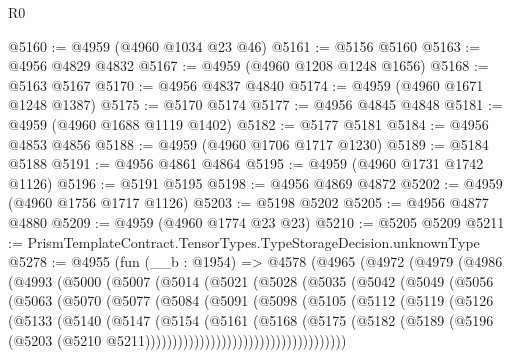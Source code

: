 \begin{lexlean}{R0}
\begin{coremodule}
@5160 := @4959 (@4960 @1034 @23 @46)
@5161 := @5156 @5160
@5163 := @4956 @4829 @4832
@5167 := @4959 (@4960 @1208 @1248 @1656)
@5168 := @5163 @5167
@5170 := @4956 @4837 @4840
@5174 := @4959 (@4960 @1671 @1248 @1387)
@5175 := @5170 @5174
@5177 := @4956 @4845 @4848
@5181 := @4959 (@4960 @1688 @1119 @1402)
@5182 := @5177 @5181
@5184 := @4956 @4853 @4856
@5188 := @4959 (@4960 @1706 @1717 @1230)
@5189 := @5184 @5188
@5191 := @4956 @4861 @4864
@5195 := @4959 (@4960 @1731 @1742 @1126)
@5196 := @5191 @5195
@5198 := @4956 @4869 @4872
@5202 := @4959 (@4960 @1756 @1717 @1126)
@5203 := @5198 @5202
@5205 := @4956 @4877 @4880
@5209 := @4959 (@4960 @1774 @23 @23)
@5210 := @5205 @5209
@5211 := PrismTemplateContract.TensorTypes.TypeStorageDecision.unknownType
@5278 := @4955
    (fun (__b : @1954) =>
    @4578
      (@4965
        (@4972
          (@4979
            (@4986
              (@4993
                (@5000
                  (@5007
                    (@5014
                      (@5021
                        (@5028
                          (@5035
                            (@5042
                              (@5049
                                (@5056
                                  (@5063
                                    (@5070
                                      (@5077
                                        (@5084
                                          (@5091
                                            (@5098
                                              (@5105
                                                (@5112
                                                  (@5119
                                                    (@5126
                                                      (@5133
                                                        (@5140
                                                          (@5147
                                                            (@5154
                                                              (@5161
                                                                (@5168
                                                                  (@5175
                                                                    (@5182
                                                                      (@5189
                                                                        (@5196
                                                                          (@5203
                                                                            (@5210
                                                                              @5211)))))))))))))))))))))))))))))))))))))

\end{coremodule}
\end{lexlean}
